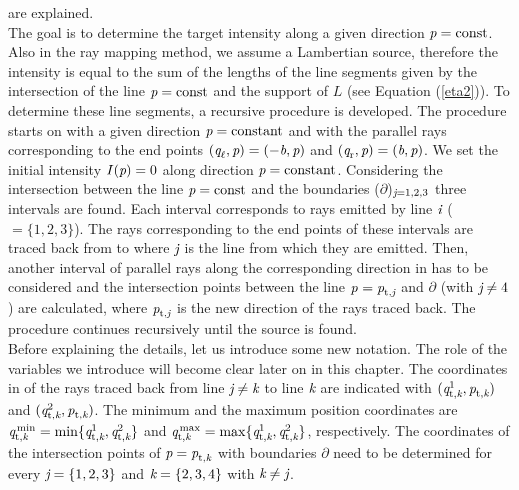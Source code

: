 are explained. \\ \indent
The goal is to determine the target intensity along a given direction $\textit{p}=\textrm{const}$.
Also in the ray mapping method, we assume a Lambertian source, therefore the intensity is equal to the sum of the lengths of the line segments given by the intersection of the line $\textit{p} = \mbox{const}$ and the support of $L$ (see Equation (\ref{eta2})).
To determine these line segments, a recursive procedure is developed.
The procedure starts on  with a given direction $\textit{p} = \textrm{constant}$ and with the parallel rays corresponding to the end points $(\textit{q}_{\ell}, \textit{p}) = (-\textit{b}, \textit{p})$ and $(\textit{q}_{\textrm{r}}, \textit{p}) = (\textit{b}, \textit{p})$. 
We set the initial intensity $I(\textit{p})=0$ along direction $\textit{p} = \textrm{constant}$. 
Considering the intersection between the line $\textit{p}=\textrm{const}$ and the boundaries ($\partial$)$_{\textit{j}=1,2,3}$ three intervals are found.
Each interval corresponds to rays emitted by line $\textit{i}$ ($=\{1,2,3\}$).
The rays corresponding to the end points of these intervals are traced back from  to  where $\textit{j}$ is the line from which
they are emitted. Then, another interval of parallel rays along the corresponding direction in  has to be considered and the intersection points between the line $\textit{p}_{\textrm{} \textit{}} = \textit{p}_{\textrm{t,} \textit{\textit{j}}}$ and $\partial$ (with $\textit{j}\neq4$) are calculated, where $\textit{p}_{\textrm{t,} \textit{\textit{j}}}$ is the new direction of the rays traced back.
The procedure continues recursively until the source is found. 
\\ \indent Before explaining the details, let us introduce some new notation. The role of the variables we introduce will become clear later on in this chapter.
The coordinates in  of the rays traced back from line $\textit{j}\neq\textit{k}$ to
line $\textit{k}$ are indicated with $(\textit{q}_{\textrm{t,} \textit{\textit{k}}}^1, \textit{p}_{\textrm{t,} \textit{\textit{k}}})$ and $(\textit{q}_{\textrm{t,} \textit{\textit{k}}}^2, \textit{p}_{\textrm{t,} \textit{\textit{k}}})$.
The minimum and the maximum position coordinates are $\textit{q}_{\textrm{t,} \textit{\textit{k}}}^\textrm{\,min} = \min\{\textit{q}_{\textrm{t,} \textit{\textit{k}}}^1, \textit{q}_{\textrm{t,} \textit{\textit{k}}}^2\}$ and 
$\textit{q}_{\textrm{t,} \textit{\textit{k}}}^\textrm{\,max} = \max\{\textit{q}_{\textrm{t,} \textit{\textit{k}}}^1, \textit{q}_{\textrm{t,} \textit{\textit{k}}}^2\}$, respectively. The coordinates of the intersection points of
$\textit{p}= \textit{p}_{\textrm{t,} \textit{\textit{k}}}$ with boundaries $\partial$ need to be determined for every $\textit{j} = \{1,2,3\}$ and $\textit{k} = \{2,3,4\}$ with $\textit{k}\neq\textit{j}$. 

